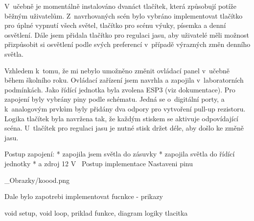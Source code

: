 \medskip
\medskip
\medskip
V~učebně je momentálně instalováno dvanáct tlačítek, která způsobují potíže běžným uživatelům.
Z~navrhovaných scén bylo vybráno implementovat tlačítko pro úplné vypnutí všech světel, tlačítko pro scénu výuky,
písemka a denní osvětlení. Dále jsem přidala tlačítko pro regulaci jasu, aby uživatelé měli možnost
přizpůsobit si osvětlení podle svých preferencí v~případě výrazných změn denního světla.

Vzhledem k~tomu, že mi nebylo umožněno změnit ovládací panel v~učebně během školního roku. Ovládací zařízení jsem navrhla
a zapojila v~laboratorních podmínkách. Jako řídící jednotka byla zvolena ESP3 (viz dokumentace).
Pro zapojení byly vybrány piny podle schématu. Jedná se o~digitální porty, a k~analogovým prvkům byly
přidány dva odpory pro vytvoření pull-up rezistoru. Logika tlačítek byla navržena tak, že každým stiskem
se aktivuje odpovídající scéna. U~tlačítek pro regulaci jasu je nutné stisk držet déle, aby došlo ke změně jasu.

Postup zapojení:
\begitems
    * zapojila jsem světla do zásuvky
    * zapojila světla do řídící jednotky
    * a zdroj 12
V~\enditems
\medskip
Postup implementace
\medskip
Nastaveni pinu

\medskip
\picw=8cm _Obrazky/koood.png
\medskip

Dale bylo zapotrebi implementovat fucnkce - prikazy

void setup, void loop, priklad funkce, diagram logiky tlacitka















